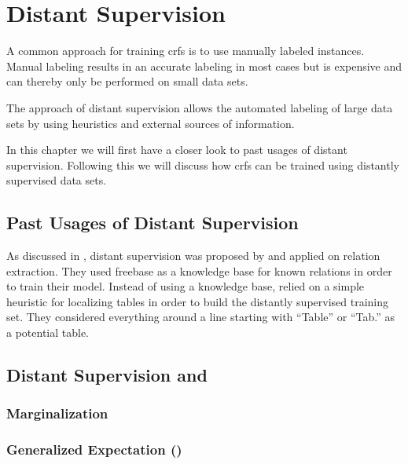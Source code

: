 \chapter{Distant Supervision}\label{cha:distant-supervision}

A common approach for training \glspl{crf} is to use manually labeled instances.
Manual labeling results in an accurate labeling in most cases but is expensive and can thereby only be performed on small data sets.


The approach of \gls{distant supervision} allows the automated labeling of large data sets by using heuristics and external sources of information.

In this chapter we will first have a closer look to past usages of \gls{distant supervision}.
Following this we will discuss how \glspl{crf} can be trained using distantly supervised data sets.

\section{Past Usages of Distant Supervision}

As discussed in , \gls{distant supervision} was proposed by \citet{mintz2009distant} and applied on relation extraction.
They used \gls{freebase} as a knowledge base for known relations in order to train their model.
%
Instead of using a knowledge base, \citet{fan2015detecting} relied on a simple heuristic for localizing tables in order to build the distantly supervised training set.
They considered everything around a line starting with ``Table'' or ``Tab.'' as a potential table.

\section{Distant Supervision and }

\subsection{Marginalization}

\subsection{Generalized Expectation ()}




